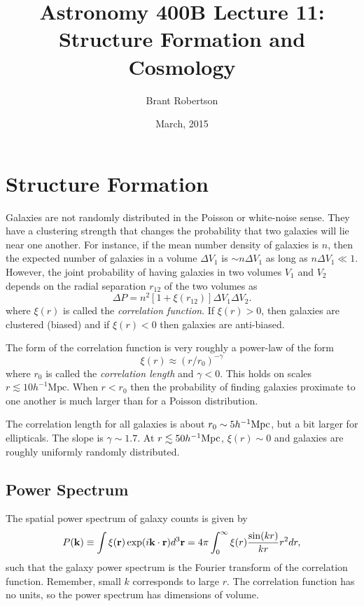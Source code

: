 \documentclass[]{article}
\title{Astronomy 400B Lecture 11: Structure Formation and Cosmology}
\author{Brant Robertson}
\date{March, 2015}
\begin{document}
\maketitle

\section{Structure Formation}

Galaxies are not randomly distributed in the
Poisson or white-noise sense. They have a 
clustering strength that changes the probability
that two galaxies will lie near one another.
For instance, if the mean number density of
galaxies is $n$, then the expected number
of galaxies in a volume $\Delta V_1$ is $\sim n\Delta V_1$
as long as $n\Delta V_1\ll1$.  However, the joint
probability of having galaxies in two volumes
$V_1$ and $V_2$ depends on the radial separation $r_{12}$
of the two volumes as
\begin{equation}
\Delta P = n^2 [1 + \xi(r_{12})]\Delta V_1 \Delta V_2.
\end{equation}
\noindent
where $\xi(r)$ is called the {\it correlation function}.
If $\xi(r)>0$, then galaxies are clustered (biased) and
if $\xi(r)<0$ then galaxies are anti-biased.

The form of the correlation function is very roughly
a power-law of the form
\begin{equation}
\xi(r) \approx (r/r_0)^{-\gamma}
\end{equation}
\noindent
where $r_0$ is called the {\it correlation length} and
$\gamma<0$.  This holds on scales $r\lesssim10 h^{-1}\mathrm{Mpc}$.
When $r<r_0$ then the probability of
finding galaxies proximate to one another is much
larger than for a Poisson distribution.

The correlation length for all galaxies is about $r_0\sim 5 h^{-1}\mathrm{Mpc}$, but
a bit larger for ellipticals.  The slope is $\gamma\sim1.7$.  At
$r\lesssim50h^{-1}\mathrm{Mpc}$, $\xi(r)\sim0$ and galaxies are roughly
uniformly randomly distributed.

\subsection{Power Spectrum}

The spatial power spectrum of galaxy counts is given by
\begin{equation}
P(\mathbf{k}) \equiv \int \xi(\mathbf{r}) \exp(i\mathbf{k}\cdot\mathbf{r})d^3\mathbf{r} = 4\pi \int_0^\infty \xi(r) \frac{\sin(kr)}{kr} r^2 dr,
\end{equation}
\noindent
such that the galaxy power spectrum is the Fourier transform of the correlation function.
Remember, small $k$ corresponds to large $r$.  The correlation function has
no units, so the power spectrum has dimensions of volume.
\end{document}
